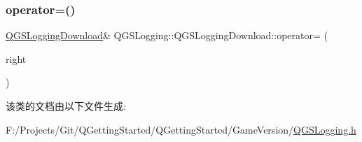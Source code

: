 \subsubsection{\texorpdfstring{operator=()}{operator=()}\hspace{0.1cm}{\footnotesize\ttfamily [2/2]}}
{\footnotesize\ttfamily \mbox{\hyperlink{class_q_g_s_logging_1_1_q_g_s_logging_download}{Q\+G\+S\+Logging\+Download}}\& Q\+G\+S\+Logging\+::\+Q\+G\+S\+Logging\+Download\+::operator= (\begin{DoxyParamCaption}\item[{\mbox{\hyperlink{class_q_g_s_logging_1_1_q_g_s_logging_download}{Q\+G\+S\+Logging\+Download}} \&\&}]{right }\end{DoxyParamCaption})\hspace{0.3cm}{\ttfamily [default]}}



该类的文档由以下文件生成\+:\begin{DoxyCompactItemize}
\item 
F\+:/\+Projects/\+Git/\+Q\+Getting\+Started/\+Q\+Getting\+Started/\+Game\+Version/\mbox{\hyperlink{_q_g_s_logging_8h}{Q\+G\+S\+Logging.\+h}}\end{DoxyCompactItemize}
